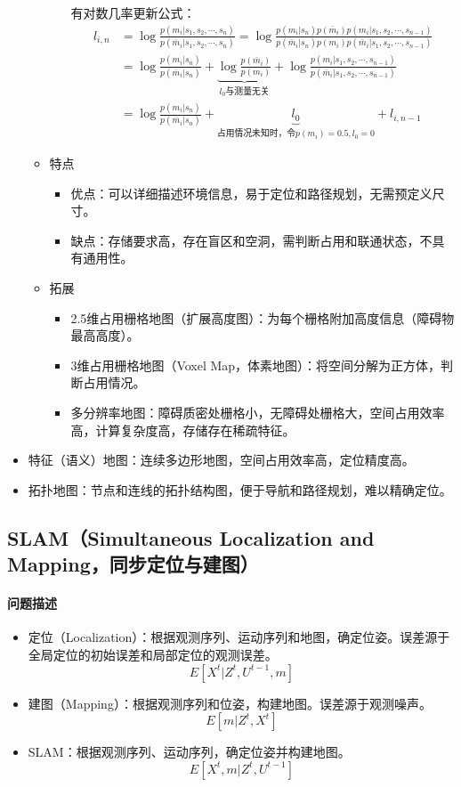 \documentclass[
12pt, %
a4paper, 
oneside, %
headinclude,footinclude, %
]{scrartcl}
\begin{document}
\begin{itemize}
\begin{itemize}
\begin{itemize}
有对数几率更新公式：
\begin{align*}
l_{i, n} &= \log\frac{p(m_i|s_1, s_2, \cdots, s_n)}{p(\bar{m}_i|s_1, s_2, \cdots, s_n)} = \log\frac{p(m_i|s_n)p(\bar{m}_i)p(m_i|s_1, s_2, \cdots, s_{n - 1})}{p(\bar{m}_i|s_n)p(m_i)p(\bar{m}_i|s_1, s_2, \cdots, s_{n - 1})} \\
&= \log\frac{p(m_i|s_n)}{p(\bar{m}_i|s_n)} + \underbrace{\log\frac{p(\bar{m}_i)}{p(m_i)}}_{l_0\text{与测量无关}} + \log\frac{p(m_i|s_1, s_2, \cdots, s_{n - 1})}{p(\bar{m}_i|s_1, s_2, \cdots, s_{n - 1})} \\
&= \log\frac{p(m_i|s_n)}{p(\bar{m}_i|s_n)} + \underbrace{l_0}_{\text{占用情况未知时，令}p(m_i) = 0.5, l_0 = 0} + l_{i, n - 1}
\end{align*}
\end{itemize}
\item 特点
\begin{itemize}
\item 优点：可以详细描述环境信息，易于定位和路径规划，无需预定义尺寸。
\item 缺点：存储要求高，存在盲区和空洞，需判断占用和联通状态，不具有通用性。
\end{itemize}
\item 拓展
\begin{itemize}
\item 2.5维占用栅格地图（扩展高度图）：为每个栅格附加高度信息（障碍物最高高度）。
\item 3维占用栅格地图（Voxel Map，体素地图）：将空间分解为正方体，判断占用情况。
\item 多分辨率地图：障碍质密处栅格小，无障碍处栅格大，空间占用效率高，计算复杂度高，存储存在稀疏特征。
\end{itemize}
\end{itemize}
\item 特征（语义）地图：连续多边形地图，空间占用效率高，定位精度高。
\item 拓扑地图：节点和连线的拓扑结构图，便于导航和路径规划，难以精确定位。
\end{itemize}
\subsection[SLAM]{SLAM（Simultaneous Localization and Mapping，同步定位与建图）}
\paragraph{问题描述}
\begin{itemize}
\item 定位（Localization）：根据观测序列、运动序列和地图，确定位姿。误差源于全局定位的初始误差和局部定位的观测误差。
$$ E[X^t|Z^t, U^{t - 1}, m] $$
\item 建图（Mapping）：根据观测序列和位姿，构建地图。误差源于观测噪声。
$$ E[m|Z^t, X^t] $$
\item SLAM：根据观测序列、运动序列，确定位姿并构建地图。
$$ E[X^t, m|Z^t, U^{t - 1}] $$
\end{itemize}
\end{document}
